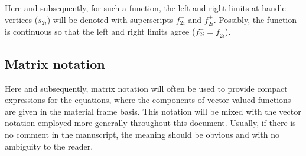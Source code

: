 Here and subsequently, for such a function, the left and right limits at handle vertices ($s_{2i}$) will be denoted with superscripts $f_{2i}^-$ and $f_{2i}^+$. Possibly, the function is continuous so that the left and right limits agree ($f_{2i}^- = f_{2i}^+$).

\subsection{Matrix notation}
Here and subsequently, matrix notation will often be used to provide compact expressions for the equations, where the components of vector-valued functions are given in the material frame basis. This notation will be mixed with the vector notation employed  more generally throughout this document. Usually, if there is no comment in the manuscript, the meaning should be obvious and with no ambiguity to the reader.

